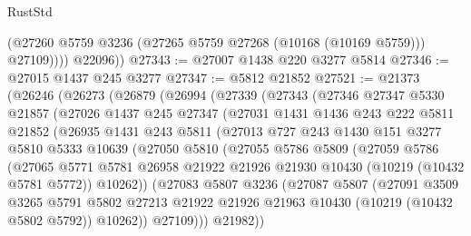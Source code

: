 \begin{lexlean}{RustStd}
\begin{coremodule}
              (@27260 @5759 @3236 (@27265 @5759 @27268 (@10168 (@10169 @5759))) @27109))))
        @22096))
@27343 := @27007 @1438 @220 @3277 @5814
@27346 := @27015 @1437 @245 @3277
@27347 := @5812 @21852
@27521 := @21373
    (@26246
      (@26273
        (@26879
          (@26994
            (@27339
              (@27343
                (@27346
                  @27347
                  @5330
                  @21857
                  (@27026
                    @1437
                    @245
                    @27347
                    (@27031
                      @1431
                      @1436
                      @243
                      @222
                      @5811
                      @21852
                      (@26935
                        @1431
                        @243
                        @5811
                        (@27013
                          @727
                          @243
                          @1430
                          @151
                          @3277
                          @5810
                          @5333
                          @10639
                          (@27050
                            @5810
                            (@27055
                              @5786
                              @5809
                              (@27059
                                @5786
                                (@27065
                                  @5771
                                  @5781
                                  @26958
                                  @21922
                                  @21926
                                  @21930
                                  @10430
                                  (@10219 (@10432 @5781 @5772))
                                  @10262))
                              (@27083
                                @5807
                                @3236
                                (@27087
                                  @5807
                                  (@27091
                                    @3509
                                    @3265
                                    @5791
                                    @5802
                                    @27213
                                    @21922
                                    @21926
                                    @21963
                                    @10430
                                    (@10219 (@10432 @5802 @5792))
                                    @10262))
                                @27109)))
                          @21982))

\end{coremodule}
\end{lexlean}
